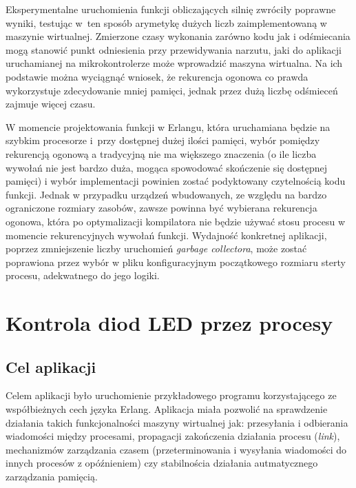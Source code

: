 Eksperymentalne uruchomienia funkcji obliczających silnię zwróciły poprawne wyniki, testując w~ten sposób arymetykę dużych liczb zaimplementowaną w maszynie wirtualnej.
Zmierzone czasy wykonania zarówno kodu jak i odśmiecania mogą stanowić punkt odniesienia przy przewidywania narzutu, jaki do aplikacji uruchamianej na mikrokontrolerze może wprowadzić maszyna wirtualna.
Na ich podstawie można wyciągnąć wniosek, że rekurencja ogonowa co prawda wykorzystuje zdecydowanie mniej pamięci, jednak przez dużą liczbę odśmieceń zajmuje więcej czasu. 

W momencie projektowania funkcji w Erlangu, która uruchamiana będzie na szybkim procesorze i~przy dostępnej dużej ilości pamięci, wybór pomiędzy rekurencją ogonową a tradycyjną nie ma większego znaczenia (o ile liczba wywołań nie jest bardzo duża, mogąca spowodować skończenie się dostępnej pamięci) i wybór implementacji powinien zostać podyktowany czytelnością kodu funkcji. Jednak w przypadku urządzeń wbudowanych, ze względu na bardzo ograniczone rozmiary zasobów, zawsze powinna być wybierana rekurencja ogonowa, która po optymalizacji kompilatora nie będzie używać stosu procesu w momencie rekurencyjnych wywołań funkcji.
Wydajność konkretnej aplikacji, poprzez zmniejszenie liczby uruchomień \emph{garbage collectora}, może zostać poprawiona przez wybór w pliku konfiguracyjnym początkowego rozmiaru sterty procesu, adekwatnego do jego logiki.


\section{Kontrola diod LED przez procesy}
\label{sec:przykladyDiody}

\subsection{Cel aplikacji}

Celem aplikacji było uruchomienie przykładowego programu korzystającego ze współbieżnych cech języka Erlang.
Aplikacja miała pozwolić na sprawdzenie działania takich funkcjonalności maszyny wirtualnej jak:
przesyłania i odbierania wiadomości między procesami, propagacji zakończenia działania procesu (\emph{link}), mechanizmów zarządzania czasem (przeterminowania i wysyłania wiadomości do innych procesów z opóźnieniem) czy stabilnościa działania autmatycznego zarządzania pamięcią.


